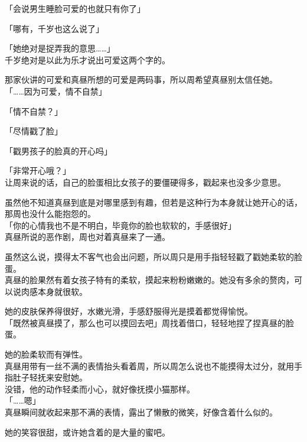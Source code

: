 「会说男生睡脸可爱的也就只有你了」

「哪有，千岁也这么说了」

「她绝对是捉弄我的意思……」\\

千岁绝对是以此为乐才说出可爱这两个字的。

那家伙讲的可爱和真昼所想的可爱是两码事，所以周希望真昼别太信任她。\\

「……因为可爱，情不自禁」

「情不自禁？」

「尽情戳了脸」

「戳男孩子的脸真的开心吗」

「非常开心哦？」\\

让周来说的话，自己的脸蛋相比女孩子的要僵硬得多，戳起来也没多少意思。

虽然他不知道真昼到底是对哪里感到有趣，但若是这种行为本身就让她开心的话，那周也没什么能抱怨的。\\

「你的心情我也不是不明白，毕竟你的脸也软软的，手感很好」\\

真昼所说的恶作剧，周也对着真昼来了一通。

虽然这么说，摸得太不客气也会出问题，所以周只是用手指轻轻戳了戳她柔软的脸蛋。\\

真昼的脸果然有着女孩子特有的柔软，摸起来粉粉嫩嫩的。她没有多余的赘肉，可以说肉感本身就很软。

她的皮肤保养得很好，水嫩光滑，手感舒服得光是摸着都觉得愉悦。\\

「既然被真昼摸了，那么也可以摸回去吧」周找着借口，轻轻地捏了捏真昼的脸蛋。

她的脸柔软而有弹性。\\

真昼用带有一丝不满的表情抬头看着周，所以周怎么说也不能摸得太过分，就用手指肚子轻抚来安慰她。\\

没错，他的动作轻柔而小心，就好像抚摸小猫那样。\\

「……嗯」\\

真昼瞬间就收起来那不满的表情，露出了懒散的微笑，好像含着什么似的。

她的笑容很甜，或许她含着的是大量的蜜吧。\\

